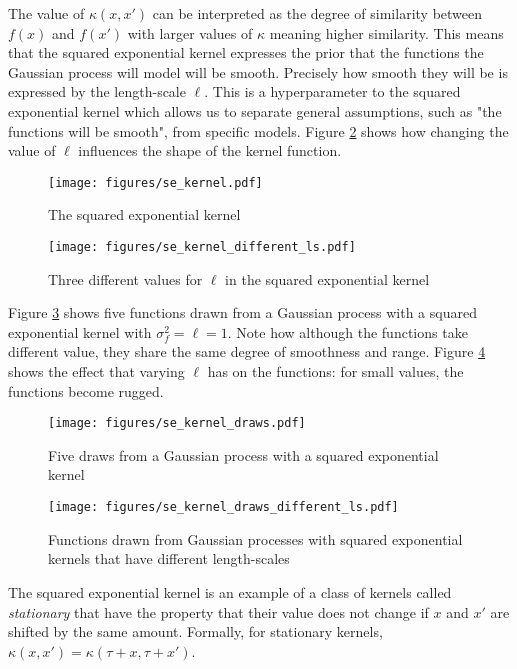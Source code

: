 \documentclass[a4paper,12pt,twoside,openright]{report}
\begin{document}
The value of $\kappa(x, x')$ can be interpreted as the degree of similarity between $f(x)$ and $f(x')$ with larger values of $\kappa$ meaning higher similarity. This means that the squared exponential kernel expresses the prior that the functions the Gaussian process will model will be smooth. Precisely how smooth they will be is expressed by the length-scale $\ell$. This is a hyperparameter to the squared exponential kernel which allows us to separate general assumptions, such as "the functions will be smooth", from specific models. Figure \ref{sekernel_ls} shows how changing the value of $\ell$ influences the shape of the kernel function.

\begin{figure}
\centering
  \texttt{[image: figures/se\_kernel.pdf]}
  \caption{The squared exponential kernel}
  \label{sekernel}
\end{figure}

\begin{figure}
\centering
  \texttt{[image: figures/se\_kernel\_different\_ls.pdf]}
  \caption{Three different values for $\ell$ in the squared exponential kernel}
  \label{sekernel_ls}
\end{figure}

Figure \ref{sekernel_draws} shows five functions drawn from a Gaussian process with a squared exponential kernel with $\sigma_f^2 = \ell = 1$. Note how although the functions take different value, they share the same degree of smoothness and range. Figure \ref{sekernel_draws_different_ls} shows the effect that varying $\ell$ has on the functions: for small values, the functions become rugged.


\begin{figure}
\centering
  \texttt{[image: figures/se\_kernel\_draws.pdf]}
  \caption{Five draws from a Gaussian process with a squared exponential kernel}
  \label{sekernel_draws}
\end{figure}

\begin{figure}
\centering
  \texttt{[image: figures/se\_kernel\_draws\_different\_ls.pdf]}
  \caption{Functions drawn from Gaussian processes with squared exponential kernels that have different length-scales}
  \label{sekernel_draws_different_ls}
\end{figure}

The squared exponential kernel is an example of a class of kernels called \emph{stationary} that have the property that their value does not change if $x$ and $x'$ are shifted by the same amount. Formally, for stationary kernels, $\kappa(x, x') = \kappa(\tau + x, \tau + x')$. 
\end{document}
